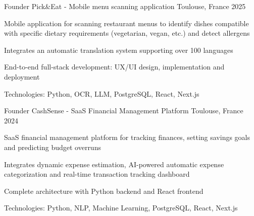


\begin{cventries}


\cventry
{Founder} %
{Pick\&Eat - Mobile menu scanning application} %
{Toulouse, France} %
{2025} %
{ %
\begin{cvitems}
\item {Mobile application for scanning restaurant menus to identify dishes compatible with specific dietary requirements (vegetarian, vegan, etc.) and detect allergens}
\item {Integrates an automatic translation system supporting over 100 languages}
\item {End-to-end full-stack development: UX/UI design, implementation and deployment}
\item {Technologies: Python, OCR, LLM, PostgreSQL, React, Next.js}
\end{cvitems}
}
\vspace{1.5em}


\cventry
{Founder} %
{CashSense - SaaS Financial Management Platform} %
{Toulouse, France} %
{2024} %
{ %
\begin{cvitems}
\item {SaaS financial management platform for tracking finances, setting savings goals and predicting budget overruns}
\item {Integrates dynamic expense estimation, AI-powered automatic expense categorization and real-time transaction tracking dashboard}
\item {Complete architecture with Python backend and React frontend}
\item {Technologies: Python, NLP, Machine Learning, PostgreSQL, React, Next.js}
\end{cvitems}
}
\vspace{1.5em}


\end{cventries}
